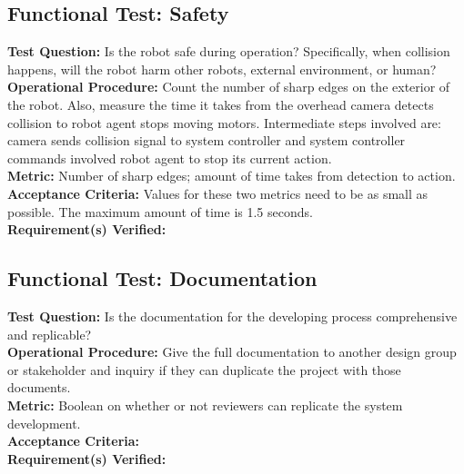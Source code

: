 \subsection{Functional Test: Safety}
\label{test:sys_ft_safety}
\textbf{Test Question:} Is the robot safe during operation? Specifically, when collision happens, will the robot harm other robots, external environment, or human?\\
\textbf{Operational Procedure:} Count the number of sharp edges on the exterior of the robot. Also, measure the time it takes from the overhead camera detects collision to robot agent stops moving motors. Intermediate steps involved are: camera sends collision signal to system controller and system controller commands involved robot agent to stop its current action. \\
\textbf{Metric:} Number of sharp edges; amount of time takes from detection to action.\\
\textbf{Acceptance Criteria:} Values for these two metrics need to be as small as possible.  The maximum amount of time is 1.5 seconds. \\
\textbf{Requirement(s) Verified:} 

\subsection{Functional Test: Documentation}
\label{test:sys_ft_Documentation}
\textbf{Test Question:} Is the documentation for the developing process comprehensive and replicable?\\
\textbf{Operational Procedure:} Give the full documentation to another design group or stakeholder and inquiry if they can duplicate the project with those documents.\\
\textbf{Metric:} Boolean on whether or not reviewers can replicate the system development.\\
\textbf{Acceptance Criteria:} \\
\textbf{Requirement(s) Verified:} 

